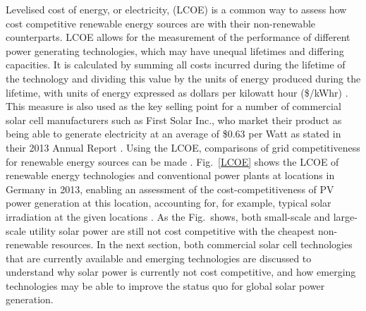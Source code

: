 \documentclass[11pt, twoside]{report}
\begin{document}
Levelised cost of energy, or electricity, (LCOE) is a common way to assess how cost competitive renewable energy sources are with their non-renewable counterparts. LCOE allows for the measurement of the performance of different power generating technologies, which may have unequal lifetimes and differing capacities. It is calculated by summing all costs incurred during the lifetime of the technology and dividing this value by the units of energy produced during the lifetime, with units of energy expressed as dollars per kilowatt hour (\$/kWhr) \cite{LCOE2}. This measure is also used as the key selling point for a number of commercial solar cell manufacturers such as First Solar Inc., who market their product as being able to generate electricity at an average of \$0.63 per Watt as stated in their 2013  Annual Report \cite{first_solar}. Using the LCOE, comparisons of grid competitiveness for renewable energy sources can be made \cite{LCOE2}. Fig.~\ref{LCOE} shows the LCOE of renewable energy technologies and conventional power plants at locations in Germany in 2013, enabling an assessment of the cost-competitiveness of PV power generation at this location, accounting for, for example, typical solar irradiation at the given locations \cite{LCOE}. As the Fig.~shows, both small-scale and large-scale utility solar power are still not cost competitive with the cheapest non-renewable resources. In the next section, both commercial solar cell technologies that are currently available and emerging technologies are discussed to understand why solar power is currently not cost competitive, and how emerging technologies may be able to improve the status quo for global solar power generation.


\end{document}
